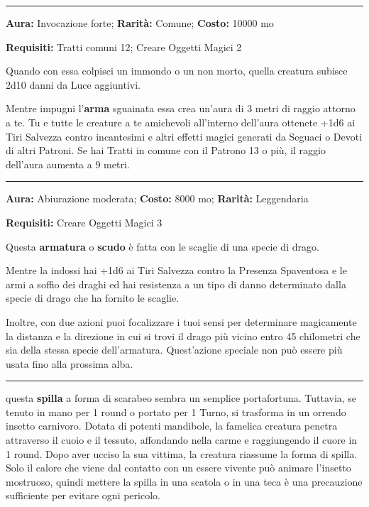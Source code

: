 \begin{multicols}{2}
\smallskip\noindent\rule{\linewidth}{2pt}  \hypertarget{Sacra}{}\medskip{}\noindent\label{Sacra}

\textbf{Aura:} Invocazione forte; \textbf{Rarità:} Comune; \textbf{Costo:} 10000 mo

\textbf{Requisiti:} Tratti comuni 12; Creare Oggetti Magici 2

Quando con essa colpisci un immondo o un non morto, quella creatura subisce 2d10 danni da Luce aggiuntivi.

Mentre impugni l'\textbf{arma} sguainata essa crea un'aura di 3 metri di raggio attorno a te. Tu e tutte le creature a te amichevoli all'interno dell'aura ottenete +1d6 ai Tiri Salvezza contro incantesimi e altri effetti magici generati da Seguaci o Devoti di altri Patroni. Se hai Tratti in comune con il Patrono 13 o più, il raggio dell'aura aumenta a 9 metri.

\smallskip\noindent\rule{\linewidth}{2pt}  \hypertarget{ScagliediDrago}{}\medskip{}\noindent\label{ScagliediDrago}

\textbf{Aura:} Abiurazione moderata; \textbf{Costo:} 8000 mo; \textbf{Rarità:} Leggendaria

\textbf{Requisiti:} Creare Oggetti Magici 3

Questa \textbf{armatura} o \textbf{scudo} è fatta con le scaglie di una specie di drago.

Mentre la indossi hai +1d6 ai Tiri Salvezza contro la Presenza Spaventosa e le armi a soffio dei draghi ed hai resistenza a un tipo di danno determinato dalla specie di drago che ha fornito le scaglie.

Inoltre, con due azioni puoi focalizzare i tuoi sensi per determinare magicamente la distanza e la direzione in cui si trovi il drago più vicino entro 45 chilometri che sia della stessa specie dell'armatura. Quest'azione speciale non può essere più usata fino alla prossima alba.

\smallskip\noindent\rule{\linewidth}{2pt}  \hypertarget{ScarabeodellaMorte}{}\medskip{}\noindent\label{ScarabeodellaMorte}

questa \textbf{spilla} a forma di scarabeo sembra un semplice portafortuna. Tuttavia, se tenuto in mano per 1 round o portato per 1 Turno, si trasforma in un orrendo insetto carnivoro. Dotata di potenti mandibole, la famelica creatura penetra attraverso il cuoio e il tessuto, affondando nella carme e raggiungendo il cuore in 1 round. Dopo aver ucciso la sua vittima, la creatura riassume la forma di spilla. Solo il calore che viene dal contatto con un essere vivente può animare l'insetto mostruoso, quindi mettere la spilla in una scatola o in una teca è una precauzione sufficiente per evitare ogni pericolo.


\end{multicols}
